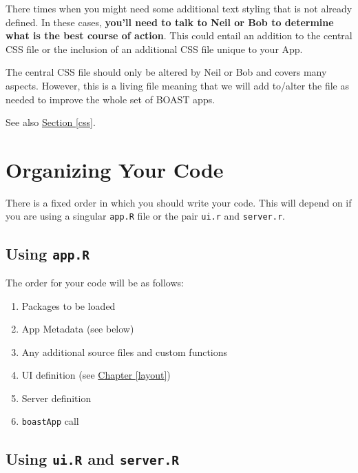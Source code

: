\documentclass[
]{book}
\providecommand{\tightlist}{%
  \setlength{\itemsep}{0pt}\setlength{\parskip}{0pt}}
\begin{document}
There times when you might need some additional text styling that is not already defined. In these cases, \textbf{you'll need to talk to Neil or Bob to determine what is the best course of action}. This could entail an addition to the central CSS file or the inclusion of an additional CSS file unique to your App.

The central CSS file should only be altered by Neil or Bob and covers many aspects. However, this is a living file meaning that we will add to/alter the file as needed to improve the whole set of BOAST apps.

See also \protect\hyperlink{css}{Section \ref{css}}.

\hypertarget{orgCode}{%
\section{Organizing Your Code}\label{orgCode}}

There is a fixed order in which you should write your code. This will depend on if you are using a singular \texttt{app.R} file or the pair \texttt{ui.r} and \texttt{server.r}.

\hypertarget{using-app.r}{%
\subsection{\texorpdfstring{Using \texttt{app.R}}{Using app.R}}\label{using-app.r}}

The order for your code will be as follows:

\begin{enumerate}
\def\labelenumi{\arabic{enumi}.}
\tightlist
\item
  Packages to be loaded
\item
  App Metadata (see below)
\item
  Any additional source files and custom functions
\item
  UI definition (see \protect\hyperlink{layout}{Chapter \ref{layout}})
\item
  Server definition
\item
  \texttt{boastApp} call
\end{enumerate}

\hypertarget{using-ui.r-and-server.r}{%
\subsection{\texorpdfstring{Using \texttt{ui.R} and \texttt{server.R}}{Using ui.R and server.R}}\label{using-ui.r-and-server.r}}
\end{document}

